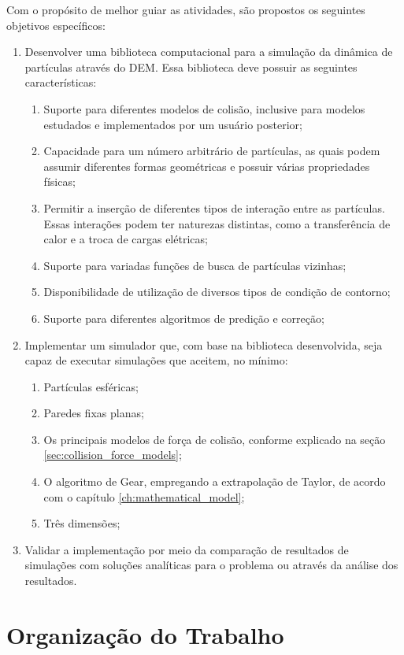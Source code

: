 Com o propósito de melhor guiar as atividades, são propostos os seguintes objetivos específicos:
\begin{enumerate}
\item Desenvolver uma biblioteca computacional para a simulação da dinâmica de partículas através do DEM. Essa biblioteca deve possuir as seguintes características: \label{item:library}
 	\begin{enumerate}
		\item Suporte para diferentes modelos de colisão, inclusive para modelos estudados e implementados por um usuário posterior;
		\item Capacidade para um número arbitrário de partículas, as quais podem assumir diferentes formas geométricas e possuir várias propriedades físicas;
        \item Permitir a inserção de diferentes tipos de interação entre as partículas. Essas interações podem ter naturezas distintas, como a transferência de calor e a troca de cargas elétricas;
		\item Suporte para variadas funções de busca de partículas vizinhas;
		\item Disponibilidade de utilização de diversos tipos de condição de contorno;
		\item Suporte para diferentes algoritmos de predição e correção;
	\end{enumerate}  
\item Implementar um simulador que, com base na biblioteca desenvolvida, seja capaz de executar simulações que aceitem, no mínimo:
	\begin{enumerate}
		\item Partículas esféricas;
		\item Paredes fixas planas;
		\item Os principais modelos de força de colisão, conforme explicado na seção \ref{sec:collision_force_models};
		\item O algoritmo de Gear, empregando a extrapolação de Taylor, de acordo com o capítulo \ref{ch:mathematical_model};
		\item Três dimensões;
	\end{enumerate}
\item Validar a implementação por meio da comparação de resultados de simulações com soluções analíticas para o problema ou através da análise dos resultados.
\end{enumerate}

\section{Organização do Trabalho}

